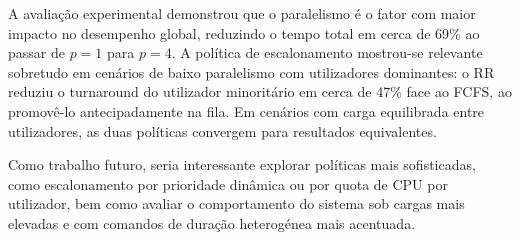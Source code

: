 \documentclass[runningheads,11pt]{llncs}
\begin{document}
                A avaliação experimental demonstrou que o paralelismo é o fator com maior impacto no 
                desempenho global, reduzindo o tempo total em cerca de 69\% ao passar de $p=1$ para $p=4$. 
                A política de escalonamento mostrou-se relevante sobretudo em cenários de baixo paralelismo 
                com utilizadores dominantes: o RR reduziu o turnaround do utilizador minoritário em cerca de 47\% 
                face ao FCFS, ao promovê-lo antecipadamente na fila. Em cenários com carga equilibrada entre utilizadores, 
                as duas políticas convergem para resultados equivalentes.

                Como trabalho futuro, seria interessante explorar políticas mais sofisticadas, 
                como escalonamento por prioridade dinâmica ou por quota de CPU por utilizador, 
                bem como avaliar o comportamento do sistema sob cargas mais elevadas e com comandos 
                de duração heterogénea mais acentuada.
\end{document}

